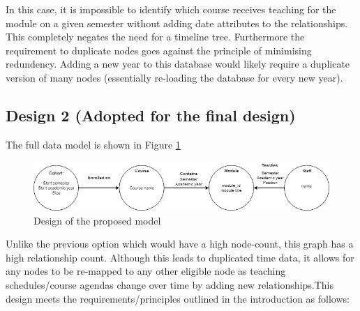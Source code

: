 \documentclass[10pt]{article}
\begin{document}
In this case, it is impossible to identify which course receives teaching for the module on a given semester without adding date attributes to the relationships. This completely negates the need for a timeline tree. Furthermore the requirement to duplicate nodes goes against the principle of minimising redundency. Adding a new year to this database would likely require a duplicate version of many nodes (essentially re-loading the database for every new year).

\subsection{Design 2 (Adopted for the final design)}

The full data model is shown in Figure \ref{model}
\begin{figure}[h]
\centering
\includegraphics[scale=0.65]{full_design}
\caption{Design of the proposed model}
\label{model}

\end{figure}

Unlike the previous option which would have a high node-count, this graph has a high relationship count. Although this leads to duplicated time data, it allows for any nodes to be re-mapped to any other eligible node as teaching schedules/course agendas change over time by adding new relationships.This design meets the requirements/principles outlined in the introduction as follows:
\end{document}
